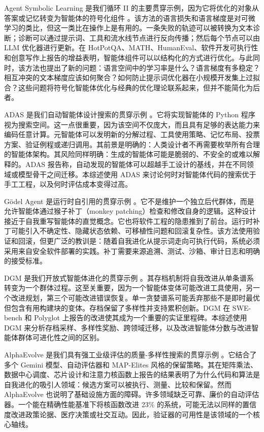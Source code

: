 Agent Symbolic Learning 是我们循环 II 的主要贯穿示例，因为它将优化的对象从答案或记忆转变为智能体的符号化组件 \cite{agentsymboliclearning2024}。该方法的语言损失和语言梯度是对可微学习的类比，但这一类比在操作上是有用的。一条失败的轨迹可以被转换为文本诊断；诊断可以通过提示词、工具和流水线节点进行反向传播；然后每个节点可以由 LLM 优化器进行更新。在 HotPotQA、MATH、HumanEval、软件开发可执行性和创意写作上报告的增益表明，智能体组件可以以结构化的方式进行优化。与此同时，该方法也提出了新的问题：语言空间中的学习率是什么？语言梯度有多稳定？相互冲突的文本梯度应该如何聚合？如何防止提示词优化器在小规模开发集上过拟合？这些问题将符号化智能体优化与经典的优化理论联系起来，但并不能简化为后者。

ADAS 是我们自动智能体设计搜索的贯穿示例 \cite{adas2025}。它将实现智能体的 Python 程序视为搜索空间。这一点很重要，因为该空间不仅庞大，而且具有足够的表达能力来编码任意计算。元智能体可以发明新的分解过程、工具使用策略、记忆布局、投票方案、验证例程或递归调用。其前景是明确的：人类设计者不再需要枚举所有合理的智能体架构。其风险同样明确：生成的智能体可能是脆弱的、不安全的或难以解释的。ADAS 报告称，自动发现的智能体可以超越手工设计的基线，并在不同领域或模型骨干之间迁移。本综述使用 ADAS 来讨论何时对智能体代码的搜索优于手工工程，以及何时评估成本变得过高。

G{\"o}del Agent 是运行时自引用的贯穿示例 \cite{yin2024godel}。它不是维护一个独立后代群体，而是允许智能体通过猴子补丁（monkey patching）检查和修改自身的逻辑。这种设计接近于自我重写智能体的直觉概念。它也将软件工程的隐患推到了前台。运行时补丁可能引入不确定性、隐藏状态依赖、可移植性问题和回滚复杂性。该方法使用验证和回滚，但更广泛的教训是：随着自我进化从提示词走向可执行代码，系统必须采用来自安全软件部署的实践。补丁需要来源追溯、测试、沙箱、审计日志和明确的接受标准。

DGM 是我们开放式智能体进化的贯穿示例 \cite{darwingodelmachine2025}。其存档机制将自我改进从单条谱系转变为一个群体过程。这至关重要，因为一个智能体变体可能改进工具使用，另一个改进规划，第三个可能改进错误恢复。单一贪婪谱系可能丢弃那些不是即时最优但包含有用构建块的变体。存档保留了多样性并支持累积创新。DGM 在 SWE-bench 和 Polyglot 上报告的改进使其成为一个重要的实证里程碑。本综述使用 DGM 来分析存档采样、多样性奖励、跨领域迁移，以及改进智能体分数与改进智能体群体可进化性之间的区别。

AlphaEvolve 是我们具有强工业级评估的质量-多样性搜索的贯穿示例 \cite{alphaevolve2025}。它结合了多个 Gemini 模型、自动评估器和 MAP-Elites 风格的保留策略。其在矩阵乘法、数据中心调度、芯片设计和注意力核函数上报告的结果表明了为什么代码和算法是自我进化的吸引人领域：候选方案可以被执行、测量、比较和保留。然而 AlphaEvolve 也说明了基础设施方面的障碍。许多领域缺乏可靠、廉价的自动评估器。一个能在精确性能基准下将核函数改进 23\% 的系统，可能无法以同样的置信度改进政策论据、医疗决策或社交互动。因此，验证器的可用性是该领域的一个核心轴线。

